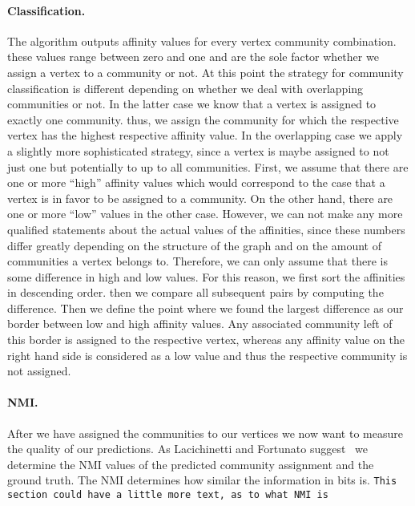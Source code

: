 \paragraph{Classification.}
The algorithm outputs affinity values for every vertex community combination. 
these values range between zero and one and are the sole factor whether we 
assign a vertex to a community or not. At this point the strategy for community classification is different depending on whether we deal with overlapping communities or not. In the latter case we know that a vertex is assigned to exactly one community. thus, we assign the community for which the respective vertex has the highest respective affinity value. In the overlapping case we apply a slightly more sophisticated strategy, since a vertex is maybe assigned to not just one but potentially to up to all communities. First, we assume that there are one or more ``high'' affinity values which would correspond to the 
case that a vertex is in favor to be assigned to a community. On the other hand, there are one or more ``low'' values in the other case. However, we can not make any more qualified statements about the actual values of the affinities, since these numbers differ greatly depending on the structure of the graph and on the amount of communities a vertex belongs to. Therefore, we can only assume that there is some difference in high and low values. For this reason, we first sort the affinities in descending order. then we compare all subsequent pairs by computing the difference. Then we define the point where we found the largest difference as our border between low and high affinity values. Any associated community left of this border is assigned to the respective vertex, whereas any affinity value on the right hand side is considered as a low value and thus the respective community is not assigned.

\paragraph{NMI.}
After we have assigned the communities to our vertices we now want to measure 
the quality of our predictions. As Lacichinetti and Fortunato 
suggest~\cite{LF09} we determine the NMI values of the predicted community 
assignment and the ground truth. The NMI determines how similar the 
information in bits is. \texttt{This section could have a little more text, as to what NMI is}
